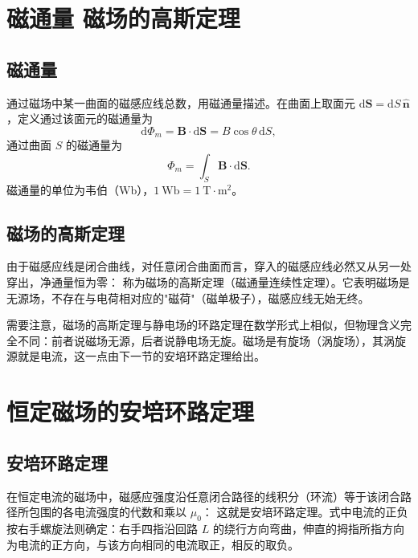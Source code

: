 
\section{磁通量 磁场的高斯定理}
    \subsection{磁通量}
    通过磁场中某一曲面的磁感应线总数，用磁通量描述。在曲面上取面元 $\mathrm{d}\boldsymbol{S}=\mathrm{d}S\,\hat{\boldsymbol{n}}$，定义通过该面元的磁通量为
    \[
    \mathrm{d}\Phi_m=\boldsymbol{B}\cdot\mathrm{d}\boldsymbol{S}=B\cos\theta\,\mathrm{d}S,
    \]
    通过曲面 $S$ 的磁通量为
    \[
    \Phi_m=\int_S\boldsymbol{B}\cdot\mathrm{d}\boldsymbol{S}.
    \]
    磁通量的单位为韦伯（$\mathrm{Wb}$），$1\ \mathrm{Wb}=1\ \mathrm{T\cdot m^{2}}$。

    \subsection{磁场的高斯定理}
    由于磁感应线是闭合曲线，对任意闭合曲面而言，穿入的磁感应线必然又从另一处穿出，净通量恒为零：
    称为磁场的高斯定理（磁通量连续性定理）。它表明磁场是无源场，不存在与电荷相对应的"磁荷"（磁单极子），磁感应线无始无终。

    需要注意，磁场的高斯定理与静电场的环路定理在数学形式上相似，但物理含义完全不同：前者说磁场无源，后者说静电场无旋。磁场是有旋场（涡旋场），其涡旋源就是电流，这一点由下一节的安培环路定理给出。


\section{恒定磁场的安培环路定理}
    \subsection{安培环路定理}
    在恒定电流的磁场中，磁感应强度沿任意闭合路径的线积分（环流）等于该闭合路径所包围的各电流强度的代数和乘以 $\mu_0$：
    这就是安培环路定理。式中电流的正负按右手螺旋法则确定：右手四指沿回路 $L$ 的绕行方向弯曲，伸直的拇指所指方向为电流的正方向，与该方向相同的电流取正，相反的取负。

